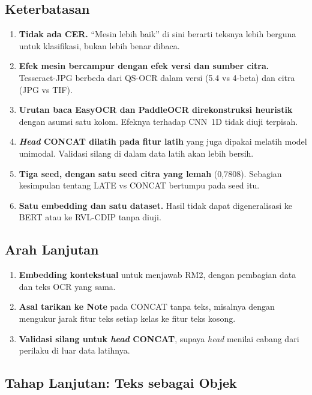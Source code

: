 \subsection{Keterbatasan}\label{sec:keterbatasan}

\begin{enumerate}
  \item \textbf{Tidak ada CER.} \enquote{Mesin lebih baik} di sini berarti teksnya lebih
  berguna untuk klasifikasi, bukan lebih benar dibaca.
  \item \textbf{Efek mesin bercampur dengan efek versi dan sumber citra.} Tesseract-JPG
  berbeda dari QS-OCR dalam versi (5.4 vs 4-beta) dan citra (JPG vs TIF).
  \item \textbf{Urutan baca EasyOCR dan PaddleOCR direkonstruksi heuristik} dengan asumsi
  satu kolom. Efeknya terhadap CNN~1D tidak diuji terpisah.
  \item \textbf{\textit{Head} CONCAT dilatih pada fitur latih} yang juga dipakai melatih
  model unimodal. Validasi silang di dalam data latih akan lebih bersih.
  \item \textbf{Tiga seed, dengan satu seed citra yang lemah} (0,7808). Sebagian
  kesimpulan tentang LATE vs CONCAT bertumpu pada seed itu.
  \item \textbf{Satu embedding dan satu dataset.} Hasil tidak dapat digeneralisasi ke BERT
  atau ke RVL-CDIP tanpa diuji.
\end{enumerate}

\subsection{Arah Lanjutan}\label{sec:arah}

\begin{enumerate}
  \item \textbf{Embedding kontekstual} untuk menjawab RM2, dengan pembagian data dan teks
  OCR yang sama.
  \item \textbf{Asal tarikan ke Note} pada CONCAT tanpa teks, misalnya dengan mengukur
  jarak fitur teks setiap kelas ke fitur teks kosong.
  \item \textbf{Validasi silang untuk \textit{head} CONCAT}, supaya \textit{head} menilai
  cabang dari perilaku di luar data latihnya.
\end{enumerate}

\subsection{Tahap Lanjutan: Teks sebagai Objek}\label{sec:lanjutan}

